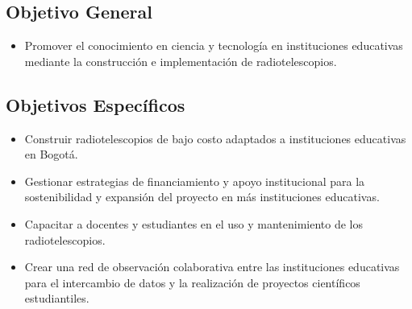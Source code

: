 \subsection{Objetivo General}
\begin{itemize}
    \item Promover el conocimiento en ciencia y tecnología en instituciones educativas mediante la construcción e implementación de radiotelescopios.
\end{itemize}

\subsection{Objetivos Específicos}
\begin{itemize}
    \item  Construir radiotelescopios de bajo costo adaptados a instituciones educativas en Bogotá.
     \item Gestionar estrategias de financiamiento y apoyo institucional para la sostenibilidad y expansión del proyecto en más instituciones educativas.
    \item Capacitar a docentes y estudiantes en el uso y mantenimiento de los radiotelescopios.
    \item Crear una red de observación colaborativa entre las instituciones educativas para el intercambio de datos y la realización de proyectos científicos estudiantiles.
\end{itemize}
